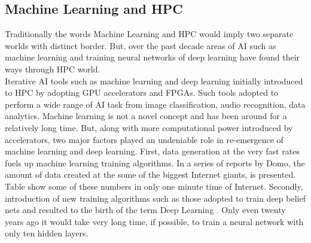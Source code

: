 \documentclass[runningheads,a4paper]{llncs}
\begin{document}
\subsection{Machine Learning and HPC}
Traditionally the words Machine Learning and HPC would imply two separate worlds with distinct border. But, over the past decade areas of AI such as machine learning and training neural networks of deep learning have found their ways through HPC world.\\

Iterative AI tools such as machine learning and deep learning initially introduced to HPC by adopting GPU accelerators and FPGAs. Such tools adopted to perform a wide range of AI task from image classification, audio recognition, data analytics. Machine learning is not a novel concept and has been around for a relatively long time. But, along with more computational power introduced by accelerators, two major factors played an undeniable role in re-emergence of machine learning and deep learning. First, data generation at the very fast rates fuels up machine learning training algorithms. In a series of reports by Domo, \cite{domo} the amount of data created at the some of the biggest Internet giants, is presented. Table show some of these numbers in only one minute time of Internet. Secondly, introduction of new training algorithms such as those adopted to train deep belief nets and resulted to the birth of the term Deep Learning \cite{hinton2006fast}. Only even twenty years ago it would take very long time, if possible, to train a neural network with only ten hidden layers.
\end{document}
